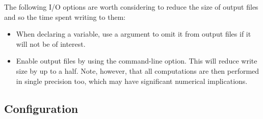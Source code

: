 The following I/O options are worth considering to reduce the size of output
files and so the time spent writing to them:
\begin{itemize}
\item When declaring a variable, use a  argument to omit
  it from output files if it will not be of interest.
\item Enable  output files by using the
   command-line option. This will reduce write size by
  up to a half. Note, however, that all computations are then performed in
  single precision too, which may have significant numerical implications.
\end{itemize}

\subsection{Configuration}

